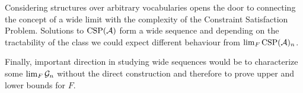 Considering structures over arbitrary vocabularies opens the door to connecting the concept of a wide limit with the complexity of the Constraint Satisfaction Problem. Solutions to $\text{CSP}(\mathcal{A})$ form a wide sequence and depending on the tractability of the class we could expect different behaviour from $\lim_{F}\text{CSP}(\mathcal{A})_n$.

Finally, important direction in studying wide sequences would be to characterize some $\lim_F\mathcal{G}_n$ without the direct construction and therefore to prove upper and lower bounds for $F$.
